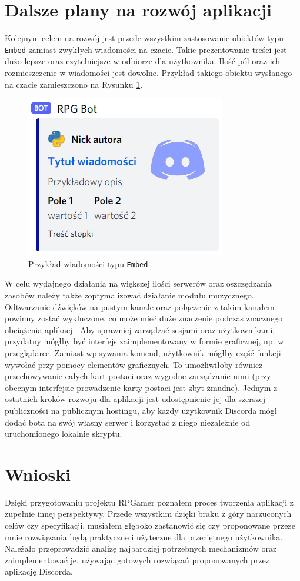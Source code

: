 \documentclass[shortabstract,inz]{iithesis}
\begin{document}
		\section{Dalsze plany na rozwój aplikacji} 
	 	Kolejnym celem na rozwój jest przede wszystkim zastosowanie obiektów typu \texttt{Embed} zamiast zwykłych wiadomości na czacie. Takie prezentowanie treści jest dużo lepsze oraz czytelniejsze w odbiorze dla użytkownika. Ilość pól oraz ich rozmieszczenie w wiadomości jest dowolne. Przykład takiego obiektu wysłanego na czacie zamieszczono na Rysunku \ref{embedexample}.
	 	\begin{figure}[h]
	 		\centering
	 		\includegraphics{embed}
	 		\caption{Przykład wiadomości typu \texttt{Embed}}
	 		\label{embedexample}
	 	\end{figure}
	 	
	 	W celu wydajnego działania na większej ilości serwerów oraz oszczędzania zasobów należy także zoptymalizować działanie modułu muzycznego. Odtwarzanie dźwięków na pustym kanale oraz połączenie z takim kanałem powinny zostać wykluczone, co może mieć duże znaczenie podczas znacznego obciążenia aplikacji. Aby sprawniej zarządzać sesjami oraz użytkownikami, przydatny mógłby być interfejs zaimplementowany w formie graficznej, np. w przeglądarce. Zamiast wpisywania komend, użytkownik mógłby część funkcji wywołać przy pomocy elementów graficznych. To umożliwiłoby również przechowywanie całych kart postaci oraz wygodne zarządzanie nimi (przy obecnym interfejsie prowadzenie karty postaci jest zbyt żmudne). Jednym z ostatnich kroków rozwoju dla aplikacji jest udostępnienie jej dla szerszej publiczności na publicznym hostingu, aby każdy użytkownik Discorda mógł dodać bota na swój własny serwer i korzystać z niego niezależnie od uruchomionego lokalnie skryptu.
	 	
	 	\section{Wnioski}
	 	Dzięki przygotowaniu projektu RPGamer poznałem proces tworzenia aplikacji z zupełnie innej perspektywy. Przede wszystkim dzięki braku z góry narzuconych celów czy specyfikacji, musiałem głęboko zastanowić się czy proponowane przeze mnie rozwiązania będą praktyczne i użyteczne dla przeciętnego użytkownika. Należało przeprowadzić analizę najbardziej potrzebnych mechanizmów oraz zaimplementować je, używając gotowych rozwiązań proponowanych przez aplikację Discorda. 
	 	
\end{document}
